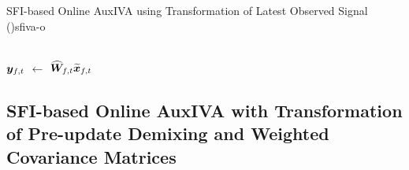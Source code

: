 \documentclass[sip,biber]{now-journal}
\begin{document}
\begin{algorithm}{SFI-based Online AuxIVA using Transformation of Latest Observed Signal (\SFIIVAo)}{sfiva-o}
\begin{pseudo}
       \ct{\eqref{eq:pb:w}, $\forall \freq$}\\
      {$\Est _{\ft}$} $\gets$ $\proj{\Demix }_{\ft} \refpos{\Obs} _{\ft}$ \ct{\eqref{eq:pb:y}, $\forall \freq$}
  \end{pseudo}
\end{algorithm}

\subsection{SFI-based Online AuxIVA with Transformation of Pre-update Demixing and Weighted Covariance Matrices}\label{subsec:proposed:sfiivam}
\end{document}
